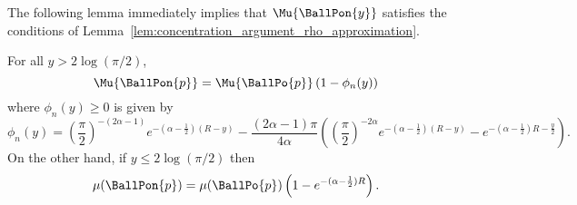 The following lemma immediately implies that $\Mu{\BallPon{y}}$ satisfies the conditions of Lemma~\ref{lem:concentration_argument_rho_approximation}.

\begin{lemma}\label{lem:average_degree_P_n}
For all $y > 2\log(\pi/2)$,
\[
	\Mu{\BallPon{p}} = \Mu{\BallPo{p}}\left(1 - \phi_n(y)\right)
\]
where $\phi_n(y) \ge 0$ is given by
\[
	\phi_n(y) = \left(\frac{\pi}{2}\right)^{-(2\alpha - 1)}e^{-(\alpha-\frac{1}{2})(R - y)}
	- \frac{(2\alpha - 1)\pi}{4\alpha}\left(\left(\frac{\pi}{2}\right)^{-2\alpha} 
	e^{-(\alpha - \frac{1}{2})(R - y)} - e^{-(\alpha - \frac{1}{2})R - \frac{y}{2}}\right).
\]
On the other hand, if $y \le 2 \log(\pi/2)$ then
\[
	\mu(\BallPon{p}) = \mu(\BallPo{p})\left(1 - e^{-(\alpha - \frac{1}{2})R}\right).
\]
\end{lemma}

